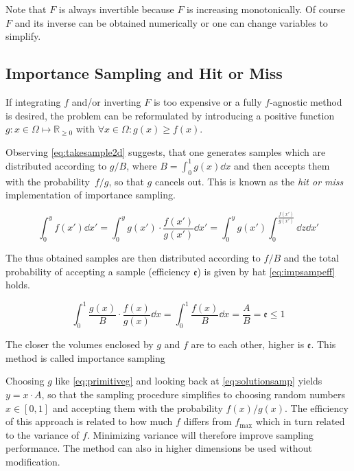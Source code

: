 Note that \(F\) is always invertible because \(F\) is
increasing monotonically. Of course \(F\) and its inverse can be
obtained numerically or one can change variables to simplify.

\subsection{Importance Sampling and Hit or Miss}%
\label{sec:hitmiss}
If integrating \(f\) and/or inverting \(F\) is too expensive or a
fully \(f\)-agnostic method is desired, the problem can be
reformulated by introducing a positive function
\(g\colon x\in\Omega\mapsto\mathbb{R}_{\geq 0}\) with
\(\forall x\in\Omega\colon g(x)\geq f(x)\).

Observing \cref{eq:takesample2d} suggests, that one generates samples
which are distributed according to \(g/B\), where
\(B=\int_0^1g(x)\dd{x}\) and then accepts them with the
probability~\(f/g\), so that \(g\) cancels out. This is known as the
\emph{hit or miss} implementation of importance sampling.

\begin{equation}
  \label{eq:takesample2d}
  \int_{0}^{y}f(x')\dd{x'} =
  \int_{0}^{y}g(x')\cdot\frac{f(x')}{g(x')}\dd{x'}
  = \int_{0}^{y}g(x')\int_{0}^{\frac{f(x')}{g(x')}}\dd{z}\dd{x'}
\end{equation}

The thus obtained samples are then distributed according to \(f/B\)
and the total probability of accepting a sample (efficiency
\(\mathfrak{e}\)) is given by hat \cref{eq:impsampeff} holds.

\begin{equation}
  \label{eq:impsampeff}
  \int_0^1\frac{g(x)}{B}\cdot\frac{f(x)}{g(x)}\dd{x} = \int_0^1\frac{f(x)}{B}\dd{x} = \frac{A}{B} = \mathfrak{e}\leq 1
\end{equation}

The closer the volumes enclosed by \(g\) and \(f\) are to each other,
higher is \(\mathfrak{e}\). This method is called importance sampling

Choosing \(g\) like \cref{eq:primitiveg} and looking back at
\cref{eq:solutionsamp} yields \(y = x\cdot A\), so that the sampling
procedure simplifies to choosing random numbers \(x\in [0,1]\) and
accepting them with the probability \(f(x)/g(x)\). The efficiency of
this approach is related to how much \(f\) differs from
\(f_{\text{max}}\) which in turn related to the variance of
\(f\). Minimizing variance will therefore improve sampling
performance. The method can also in higher dimensions be used without
modification.

